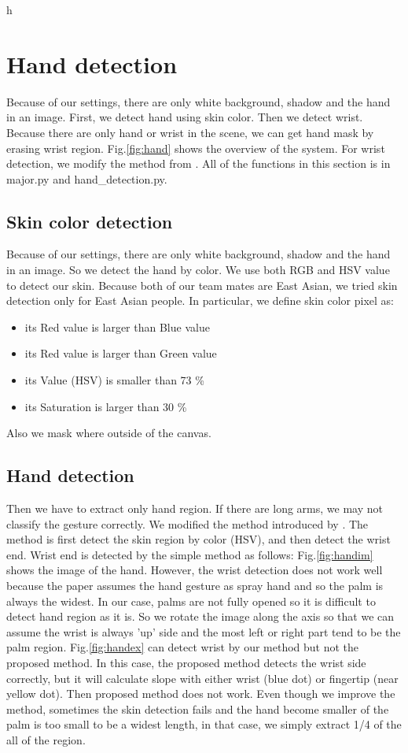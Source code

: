 h\section{Hand detection}
Because of our settings, there are only white background, shadow and the hand in an image.
First, we detect hand using skin color. Then we detect wrist. Because there are only hand or wrist in the scene, we can get hand mask by erasing wrist region. Fig.\ref{fig:hand} shows the overview of the system. For wrist detection, we modify the method from \cite{ra11}.
All of the functions in this section is in major.py and hand\_detection.py.
\subsection{Skin color detection}
Because of our settings, there are only white background, shadow and the hand in an image.
So we detect the hand by color. We use both RGB and HSV value to detect our skin.
Because both of our team mates are East Asian, we tried skin detection only for East Asian people.
In particular, we define skin color pixel as:
\begin{itemize}
  \item its Red value is larger than Blue value
  \item its Red value is larger than Green value
  \item its Value (HSV) is smaller than 73 \%
  \item its Saturation is larger than 30 \%
 \end{itemize}
Also we mask where outside of the canvas.
\subsection{Hand detection}
Then we have to extract only hand region. If there are long arms, we may not classify the gesture correctly. We modified the method introduced by \cite{ra11}. The method is first detect the skin region by color (HSV), and then detect the wrist end. Wrist end is detected by the simple method as follows:
Fig.\ref{fig:handim} shows the image of the hand. 
However, the wrist detection does not work well because the paper assumes the hand gesture as spray hand and so the palm is always the widest. 
In our case, palms are not fully opened so it is difficult to detect hand region as it is. 
So we rotate the image along the axis so that we can assume the wrist is always 'up' side and the most left or right part tend to be the palm region.
Fig.\ref{fig:handex}  can detect wrist by our method but not the proposed method. In this case, the proposed method detects the wrist side correctly, but it will calculate slope with either
wrist (blue dot) or fingertip (near yellow dot). Then proposed method does not work.
Even though we improve the method, sometimes the skin detection fails and the hand become smaller of the palm is too small to be a widest length, in that case, we simply extract 1/4 of the all of the region.

